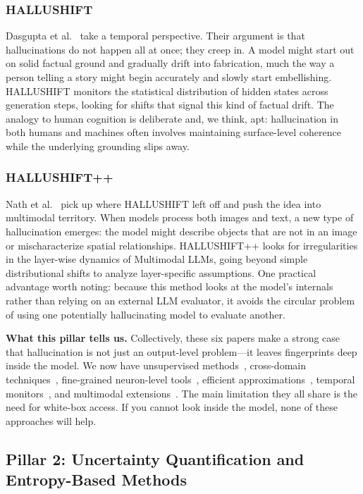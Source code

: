 \documentclass[journal]{IEEEtran}
\begin{document}
\subsubsection{HALLUSHIFT}
Dasgupta et al.~\cite{hallushift} take a temporal perspective. Their argument is that hallucinations do not happen all at once; they creep in. A model might start out on solid factual ground and gradually drift into fabrication, much the way a person telling a story might begin accurately and slowly start embellishing. HALLUSHIFT monitors the statistical distribution of hidden states across generation steps, looking for shifts that signal this kind of factual drift. The analogy to human cognition is deliberate and, we think, apt: hallucination in both humans and machines often involves maintaining surface-level coherence while the underlying grounding slips away.

\subsubsection{HALLUSHIFT++}
Nath et al.~\cite{hallushift_pp} pick up where HALLUSHIFT left off and push the idea into multimodal territory. When models process both images and text, a new type of hallucination emerges: the model might describe objects that are not in an image or mischaracterize spatial relationships. HALLUSHIFT++ looks for irregularities in the layer-wise dynamics of Multimodal LLMs, going beyond simple distributional shifts to analyze layer-specific assumptions. One practical advantage worth noting: because this method looks at the model's internals rather than relying on an external LLM evaluator, it avoids the circular problem of using one potentially hallucinating model to evaluate another.

\textbf{What this pillar tells us.} Collectively, these six papers make a strong case that hallucination is not just an output-level problem---it leaves fingerprints deep inside the model. We now have unsupervised methods~\cite{mind}, cross-domain techniques~\cite{prism}, fine-grained neuron-level tools~\cite{mhad}, efficient approximations~\cite{sep}, temporal monitors~\cite{hallushift}, and multimodal extensions~\cite{hallushift_pp}. The main limitation they all share is the need for white-box access. If you cannot look inside the model, none of these approaches will help.

\subsection{Pillar 2: Uncertainty Quantification and Entropy-Based Methods}
\end{document}
